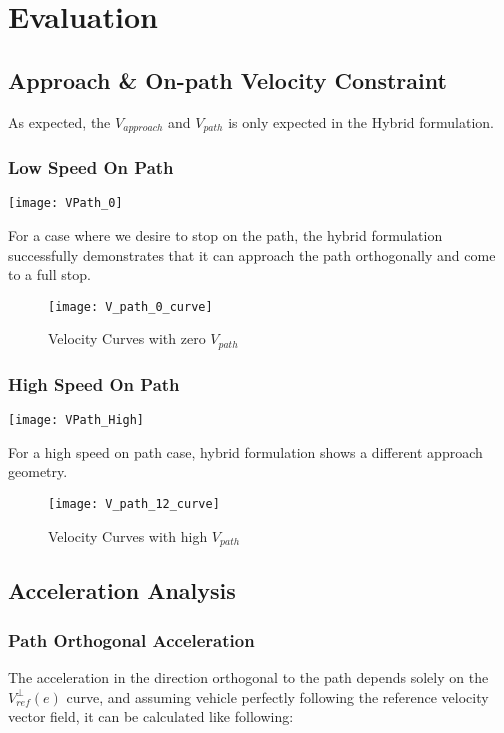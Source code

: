 \chapter{Evaluation}
\label{sec:evaluation}

\section{Approach \& On-path Velocity Constraint}

As expected, the $V_{approach}$ and $V_{path}$ is only expected in the Hybrid formulation.

\subsection{Low Speed On Path}

\texttt{[image: VPath\_0]}

For a case where we desire to stop on the path, the hybrid formulation successfully demonstrates that it can approach the path orthogonally and come to a full stop.

\begin{figure}[h]
\centering
\texttt{[image: V\_path\_0\_curve]}
\caption{Velocity Curves with zero $V_{path}$}
\end{figure}

\subsection{High Speed On Path}

\texttt{[image: VPath\_High]}

For a high speed on path case, hybrid formulation shows a different approach geometry.

\begin{figure}[h]
\centering
\texttt{[image: V\_path\_12\_curve]}
\caption{Velocity Curves with high $V_{path}$}
\end{figure}

\section{Acceleration Analysis}

\subsection{Path Orthogonal Acceleration}
The acceleration in the direction orthogonal to the path depends solely on the $V_{ref}^{\perp}(e)$ curve, and assuming vehicle perfectly following the reference velocity vector field, it can be calculated like following:

